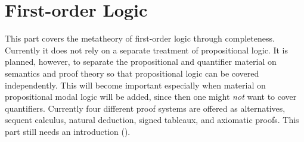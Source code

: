 \documentclass[../../include/open-logic-part]{subfiles}
\begin{document}
\part{First-order Logic}

\begin{editorial}
  This part covers the metatheory of first-order logic through
  completeness.  Currently it does not rely on a separate treatment of
  propositional logic.  It is planned, however, to separate the
  propositional and quantifier material on semantics and proof theory
  so that propositional logic can be covered independently.  This will
  become important especially when material on propositional modal
  logic will be added, since then one might \emph{not} want to cover
  quantifiers.  Currently four different proof systems are offered as
  alternatives, sequent calculus, natural deduction, signed tableaux,
  and axiomatic proofs. This part still needs an introduction
  ().
\end{editorial}










\OLEndPartHook
\end{document}
